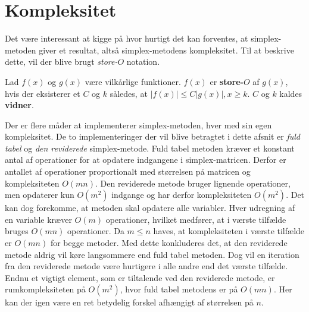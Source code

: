 \section{Kompleksitet}
Det være interessant at kigge på hvor hurtigt det kan forventes, at simplex-metoden giver et resultat, altså simplex-metodens kompleksitet.
Til at beskrive dette, vil der blive brugt \textit{store-$O$} notation.
%
\begin{defn}{}{}
Lad $f(x)$ og $g(x)$ være vilkårlige funktioner. $f(x)$ er \textbf{store-$O$} af $g(x)$, hvis der eksisterer et $C$ og $k$ således, at $|f(x)| \leq C|g(x)|, x \geq k$. $C$ og $k$ kaldes \textbf{vidner}.
\end{defn}\noindent
%
Der er flere måder at implementerer simplex-metoden, hver med sin egen kompleksitet.
De to implementeringer der vil blive betragtet i dette afsnit er \textit{fuld tabel} og \textit{den reviderede} simplex-metode.
%
Fuld tabel metoden kræver et konstant antal af operationer for at opdatere indgangene i simplex-matricen.
Derfor er antallet af operationer proportionalt med størrelsen på matricen og kompleksiteten $O(mn)$.
Den reviderede metode bruger lignende operationer, men opdaterer kun $O(m^2)$ indgange og har derfor kompleksiteten $O(m^2)$.
Det kan dog forekomme, at metoden skal opdatere alle variabler.
Hver udregning af en variable kræver $O(m)$ operationer, hvilket medfører, at i værste tilfælde bruges $O(mn)$ operationer.
Da $m \leq n$ haves, at kompleksiteten i værste tilfælde er $O(mn)$ for begge metoder.
Med dette konkluderes det, at den reviderede metode aldrig vil køre langsommere end fuld tabel metoden.
Dog vil en iteration fra den reviderede metode være hurtigere i alle andre end det værste tilfælde.
Endnu et vigtigt element, som er tiltalende ved den reviderede metode, er rumkompleksiteten på $O(m^2)$, hvor fuld tabel metodens er på $O(mn)$.
Her kan der igen være en ret betydelig forskel afhængigt af størrelsen på $n$.